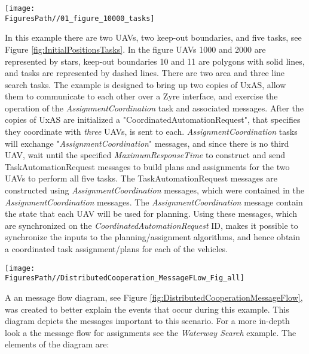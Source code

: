 \begin{marginfigure}[170pt]
	\hspace{-35pt}\texttt{[image: \\FiguresPath//01\_figure\_10000\_tasks]}
	\caption{Initial UAV positions, requested tasks, and keep-out boundaries.}
	\label{fig:InitialPositionsTasks}
\end{marginfigure}


In this example there are two UAVs, two keep-out boundaries, and five tasks, see Figure \ref{fig:InitialPositionsTasks}. In the figure UAVs 1000 and 2000 are represented by stars, keep-out boundaries 10 and 11 are polygons with solid lines, and tasks are represented by dashed lines. There are two area and three line search tasks. The example is designed to bring up two copies of UxAS, allow them to communicate to each other over a Zyre interface, and exercise the operation of the \textit{AssignmentCoordination} task and associated messages. After the copies of UxAS are initialized a "CoordinatedAutomationRequest", that specifies they coordinate with \textit{three} UAVs, is sent to each. \textit{AssignmentCoordination} tasks will exchange "\textit{AssignmentCoordination}" messages, and since there is no third UAV, wait until the specified \textit{MaximumResponseTime} to construct and send TaskAutomationRequest messages to build plans and assignments for the two UAVs to perform all five tasks. The TaskAutomationRequest messages are constructed using  \textit{AssignmentCoordination} messages, which were contained in the \textit{AssignmentCoordination} messages. The \textit{AssignmentCoordination} message contain the state that each UAV will be used for planning. Using these messages, which are synchronized on the \textit{CoordinatedAutomationRequest} ID, makes it possible to synchronize the inputs to the planning/assignment algorithms, and hence obtain a coordinated task assignment/plans for each of the vehicles. 


\begin{figure*}
	\texttt{[image: \\FiguresPath//DistributedCooperation\_MessageFLow\_Fig\_all]}
	\caption{Distributed cooperation example message flow.}
	\label{fig:DistributedCooperationMessageFlow}
\end{figure*}

A an message flow diagram, see Figure \ref{fig:DistributedCooperationMessageFlow}, was created to better explain the events that occur during this example. This diagram depicts the messages important to this scenario. For a more in-depth look a the message flow for assignments see the \textit{Waterway Search} example. The elements of the diagram are:

